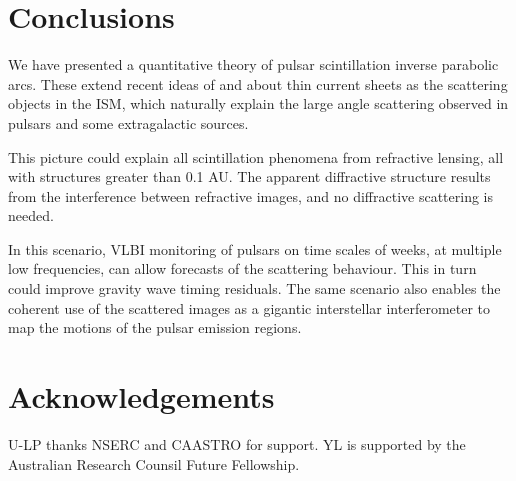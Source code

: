 \documentclass[useAMS,usenatbib]{mn2e}
\begin{document}
\section{Conclusions}

We have presented a quantitative theory of pulsar scintillation
inverse parabolic arcs.  These extend recent ideas of
\citet{2006ApJ...640L.159G} and \citet{2012MNRAS.421L.132P} about thin
current sheets as the scattering objects in the ISM, which naturally
explain the large angle scattering observed in pulsars and some
extragalactic sources.

This picture could explain all scintillation phenomena from refractive
lensing, all with structures greater than 0.1 AU.  The apparent
diffractive structure results from the interference between refractive
images, and no diffractive scattering is needed.

In this scenario, VLBI monitoring of pulsars on time scales of weeks,
at multiple low frequencies, can allow forecasts of the scattering
behaviour.  This in turn could improve gravity wave timing residuals.
The same scenario also enables the coherent use of the scattered
images as a gigantic interstellar interferometer to map the motions of
the pulsar emission regions.

\section{Acknowledgements}

U-LP thanks NSERC and CAASTRO for support. YL is supported 
by the Australian Research Counsil Future Fellowship.


\newcommand{\araa}{ARA\&A}   %
\newcommand{\afz}{Afz}       %
\newcommand{\aj}{AJ}         %
\newcommand{\azh}{AZh}       %
\newcommand{\aaa}{A\&A}      %
\newcommand{\aas}{A\&AS}     %
\newcommand{\aar}{A\&AR}     %
\newcommand{\apj}{ApJ}       %
\newcommand{\apjs}{ApJS}     %
\newcommand{\apjl}{ApJ}      %
\newcommand{\apss}{Ap\&SS}   %
\newcommand{\baas}{BAAS}     %
\newcommand{\jaa}{JA\&A}     %
\newcommand{\mnras}{MNRAS}   %
\newcommand{\nat}{Nat}       %
\newcommand{\pasj}{PASJ}     %
\newcommand{\pasp}{PASP}     %
\newcommand{\paspc}{PASPC}   %
\newcommand{\qjras}{QJRAS}   %
\newcommand{\sci}{Sci}       %
\newcommand{\solphys}{Solar Physics}       %
\newcommand{\sova}{SvA}      %
\newcommand{\aap}{A\&A}






\label{lastpage}
\end{document}
